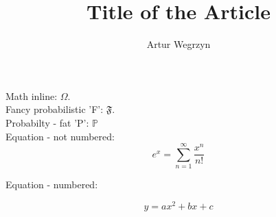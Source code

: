 \documentclass[12pt]{article}
\begin{document}
\title{Title of the Article}
\author{Artur Wegrzyn}
\maketitle


Math inline: $\Omega$. \\
Fancy probabilistic 'F': $\mathfrak{F}$. \\
Probabilty - fat 'P': $\mathbb{P}$ \\ 
Equation - not numbered:
\begin{equation*}
e^x = \sum_{n=1}^{\infty}\frac{x^n}{n!}
\end{equation*}

Equation - numbered:

\begin{equation}
y = ax^2 + bx + c
\end{equation}
\end{document}
